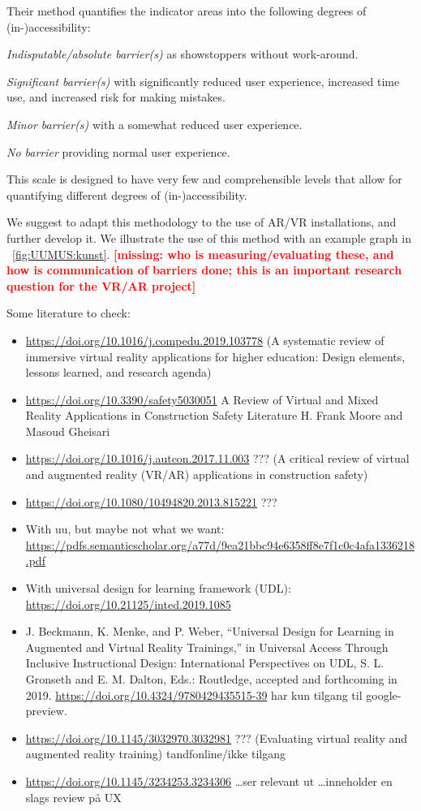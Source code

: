 \documentclass[11pt,english]{nik}
\newcommand{\WVL}[1]{\textbf{\textcolor{red}{#1}}}
\begin{document}
Their method quantifies the indicator areas into the following degrees of (in-)accessibility:
\begin{enumerate*}[label={\arabic*:},ref=\arabic*]
\item \emph{Indisputable/absolute barrier(s)} as showstoppers without work-around.
\item \emph{Significant barrier(s)} with significantly reduced user experience,
  increased time use, and increased risk for making mistakes. 
\item \emph{Minor barrier(s)} with a somewhat reduced user experience.
\item \emph{No barrier} providing normal user experience.
\end{enumerate*}
This scale is designed to have very few and comprehensible levels that
allow for quantifying different degrees of (in-)accessibility.

We suggest to adapt  this methodology to the use of AR/VR installations, and further develop it. 
We illustrate the use of this method with an example graph in \figurename~\ref{fig:UUMUS:kunst}.
\WVL{[missing: who is measuring/evaluating these, and how is communication of barriers done; this is an important research question for the VR/AR project]}


Some literature to check: 
\begin{itemize}
\item \url{https://doi.org/10.1016/j.compedu.2019.103778} (A systematic review of immersive virtual reality applications for higher education: Design elements, lessons learned, and research agenda)
\item \url{https://doi.org/10.3390/safety5030051} A Review of Virtual and Mixed Reality Applications in Construction Safety Literature H. Frank Moore and Masoud Gheisari 
\item \url{https://doi.org/10.1016/j.autcon.2017.11.003} ??? (A critical review of virtual and augmented reality (VR/AR) applications in construction safety) 
\item \url{https://doi.org/10.1080/10494820.2013.815221} ???
\item With uu, but maybe not what we want: \url{https://pdfs.semanticscholar.org/a77d/9ea21bbc94e6358ff8e7f1c0c4afa1336218.pdf}
\item With universal design for learning framework (UDL):  \url{https://doi.org/10.21125/inted.2019.1085} 
\item J. Beckmann, K. Menke, and P. Weber, “Universal Design for Learning in Augmented and Virtual Reality Trainings,” in Universal Access Through Inclusive Instructional Design: International Perspectives on UDL, S. L. Gronseth and E. M. Dalton, Eds.: Routledge, accepted and forthcoming in 2019. \url{https://doi.org/10.4324/9780429435515-39} har kun tilgang til google-preview. 
\item \url{https://doi.org/10.1145/3032970.3032981} ??? (Evaluating virtual reality and augmented reality training) tandfonline/ikke tilgang
\item \url{https://doi.org/10.1145/3234253.3234306} \dots ser relevant ut \dots inneholder en slags review på UX 
\end{itemize}
\end{document}
